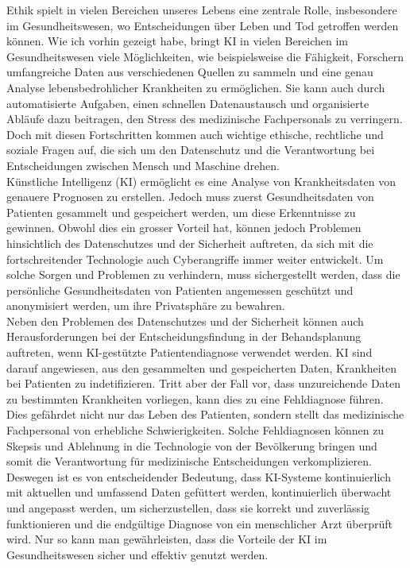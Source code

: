 \documentclass{report}
\begin{document}
Ethik spielt in vielen Bereichen unseres Lebens eine zentrale Rolle, insbesondere 
im Gesundheitswesen, wo Entscheidungen über Leben und Tod getroffen werden können. 
Wie ich vorhin gezeigt habe, bringt KI in vielen Bereichen im Gesundheitswesen viele Möglichkeiten, wie beispielsweise
die Fähigkeit, Forschern umfangreiche Daten aus verschiedenen Quellen zu sammeln und eine
genau Analyse lebensbedrohlicher Krankheiten zu ermöglichen. Sie kann auch durch automatisierte Aufgaben, einen schnellen 
Datenaustausch und organisierte Abläufe dazu beitragen, den Stress des medizinische Fachpersonals zu verringern.
Doch mit diesen Fortschritten kommen auch wichtige ethische, rechtliche und soziale 
Fragen auf, die sich um den Datenschutz und die Verantwortung bei Entscheidungen zwischen Mensch und Maschine drehen.
\\
Künstliche Intelligenz (KI) ermöglicht es eine Analyse von Krankheitsdaten von
genauere Prognosen zu erstellen. Jedoch muss zuerst Gesundheitsdaten von Patienten gesammelt und
gespeichert werden, um diese Erkenntnisse zu gewinnen. Obwohl dies ein grosser Vorteil hat, können jedoch Problemen 
hinsichtlich des Datenschutzes und der Sicherheit auftreten, da sich mit die fortschreitender Technologie auch 
Cyberangriffe immer weiter entwickelt.\citep{clutch} Um solche Sorgen und Problemen zu verhindern, muss sichergestellt werden,
dass die persönliche Gesundheitsdaten von Patienten angemessen geschützt und anonymisiert werden, um ihre Privatsphäre 
zu bewahren.
\\
Neben den Problemen des Datenschutzes und der Sicherheit können auch Herausforderungen bei der Entscheidungsfindung in der Behandsplanung auftreten, wenn KI-gestützte
Patientendiagnose verwendet werden. KI sind darauf angewiesen, aus den gesammelten und gespeicherten Daten, 
Krankheiten bei Patienten zu indetifizieren. Tritt aber der Fall vor, dass unzureichende Daten zu bestimmten Krankheiten 
vorliegen, kann dies zu eine Fehldiagnose führen. Dies gefährdet nicht nur das Leben des Patienten, sondern stellt das medizinische 
Fachpersonal von erhebliche Schwierigkeiten. Solche Fehldiagnosen können zu Skepsis und Ablehnung in die Technologie von der Bevölkerung bringen
und somit die Verantwortung für medizinische Entscheidungen verkomplizieren. Deswegen ist es von entscheidender Bedeutung, 
dass KI-Systeme kontinuierlich mit aktuellen und umfassend Daten gefüttert werden, kontinuierlich überwacht und angepasst werden, um sicherzustellen, dass sie korrekt und zuverlässig funktionieren
und die endgültige Diagnose von ein menschlicher Arzt überprüft wird. Nur so kann man gewährleisten, dass die Vorteile
der KI im Gesundheitswesen sicher und effektiv genutzt werden. 
\end{document}
